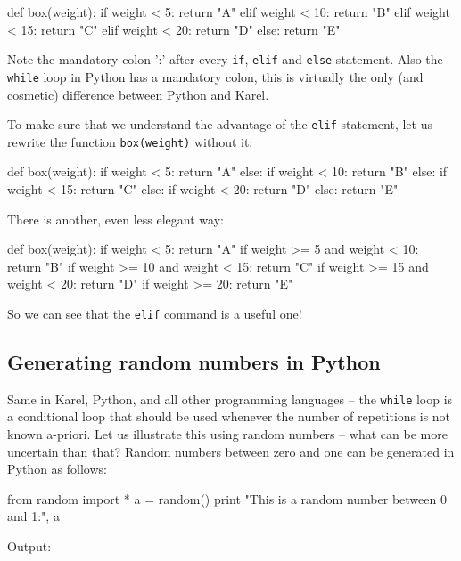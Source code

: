\begin{bluecode}
def box(weight):
    if weight < 5:
        return "A"
    elif weight < 10:
        return "B"
    elif weight < 15:
        return "C"
    elif weight < 20:
        return "D"
    else:
        return "E"
\end{bluecode}
Note the mandatory colon ':' after every {\tt if}, {\tt elif} and {\tt else} statement. Also
the {\tt while} loop in Python has a mandatory colon, this is virtually the only 
(and cosmetic) difference between Python and Karel.

To make sure that we understand the advantage of the {\tt elif} statement, let us rewrite 
the function {\tt box(weight)} without it:

\begin{bluecode}
def box(weight):
    if weight < 5:
        return "A"
    else:
        if weight < 10:
            return "B"
        else:
            if weight < 15:
                return "C"
            else:
                if weight < 20:
                    return "D"
                else:
                    return "E"
\end{bluecode}
There is another, even less elegant way:

\begin{bluecode}
def box(weight):
    if weight < 5:
        return "A"
    if weight >= 5 and weight < 10:
        return "B"
    if weight >= 10 and weight < 15:
        return "C"
    if weight >= 15 and weight < 20:
        return "D"
    if weight >= 20:
        return "E"
\end{bluecode}
So we can see that the {\tt elif} command is a useful one!

\subsection{Generating random numbers in Python}

Same in Karel, Python, and all other programming 
languages -- the {\tt while} loop is a conditional loop that should be used whenever the number of repetitions 
is not known a-priori. Let us illustrate this using random numbers -- what can be more uncertain than that?
Random numbers between 
zero and one can be generated in Python as follows:

\begin{bluecode}
from random import *
a = random()
print "This is a random number between 0 and 1:", a
\end{bluecode}
Output:

